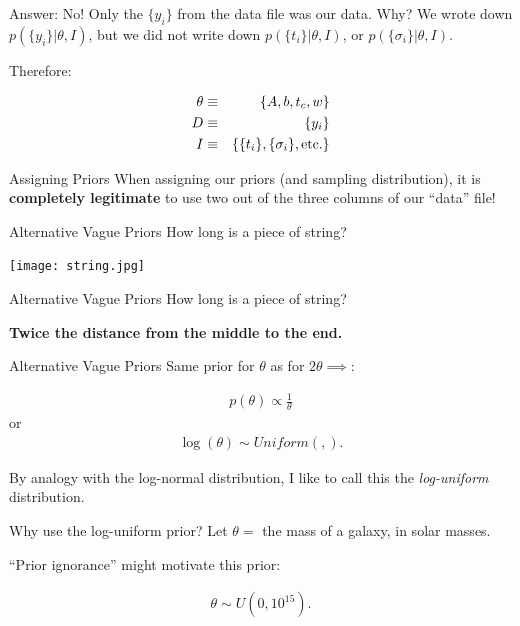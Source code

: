 \begin{frame}[t]{Answer: No!}
Only the $\{y_i\}$ from the data file was our data. Why? We wrote down
$p(\{y_i\} | \theta, I)$, but we did not write down $p(\{t_i\} | \theta, I)$, or
$p(\{\sigma_i\} | \theta, I)$.

Therefore:

\begin{eqnarray*}
\theta &\equiv& \{A, b, t_c, w\}\\
D &\equiv& \{y_i\}\\
I &\equiv& \{\{t_i\}, \{\sigma_i\}, \textnormal{etc.}\}
\end{eqnarray*}

\end{frame}

\begin{frame}[t]{Assigning Priors}
When assigning our priors (and sampling distribution), it is {\bf completely
legitimate} to use two out of the three columns of our ``data'' file!
\end{frame}

\begin{frame}[t]{Alternative Vague Priors}
How long is a piece of string?
\begin{center}
\texttt{[image: string.jpg]}
\end{center}
\end{frame}

\begin{frame}[t]{Alternative Vague Priors}
How long is a piece of string?

{\bf Twice the distance from the middle to the end.}
\end{frame}

\begin{frame}[t]{Alternative Vague Priors}
Same prior for $\theta$ as for $2\theta \implies$:

\begin{eqnarray*}
p(\theta) \propto \frac{1}{\theta}
\end{eqnarray*}
or
\begin{eqnarray*}
\log(\theta) \sim Uniform(,).
\end{eqnarray*}

By analogy with the log-normal distribution, I like to call this the
{\it log-uniform} distribution.
\end{frame}

\begin{frame}[t]{Why use the log-uniform prior?}
Let $\theta =$ the mass of a galaxy, in solar masses.

``Prior ignorance'' might motivate this prior:

\begin{eqnarray*}
\theta \sim U(0, 10^{15}).
\end{eqnarray*}

\end{frame}

